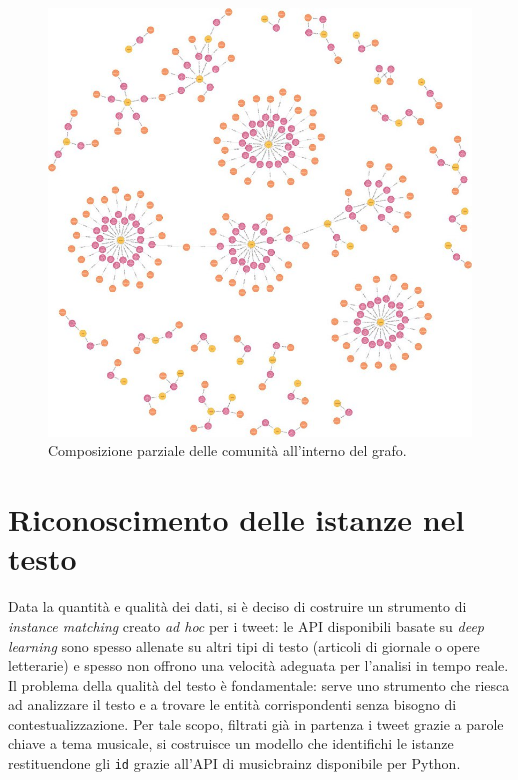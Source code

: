 \documentclass[12pt, a4paper, twocolumn]{article} %
\begin{document}
\begin{figure}[h!]
  \centering
  \includegraphics{big_graph.png}
  \caption{Composizione parziale delle comunità all'interno del grafo.}
  \label{fig:neo4jmacro}
\end{figure}

\section{Riconoscimento delle istanze nel testo}
Data la quantità e qualità dei dati, si è deciso di costruire un strumento di \textit{instance matching} creato \textit{ad hoc} per i tweet: le API disponibili basate su \textit{deep learning} sono spesso allenate su altri tipi di testo (articoli di giornale o opere letterarie) e spesso non offrono una velocità adeguata per l'analisi in tempo reale.
Il problema della qualità del testo è fondamentale: serve uno strumento che riesca ad analizzare il testo e a trovare le entità corrispondenti senza bisogno di contestualizzazione.
Per tale scopo, filtrati già in partenza i tweet grazie a parole chiave a tema musicale, si costruisce un modello che identifichi le istanze restituendone gli \verb|id| grazie all'API di musicbrainz disponibile per Python.
\end{document}

